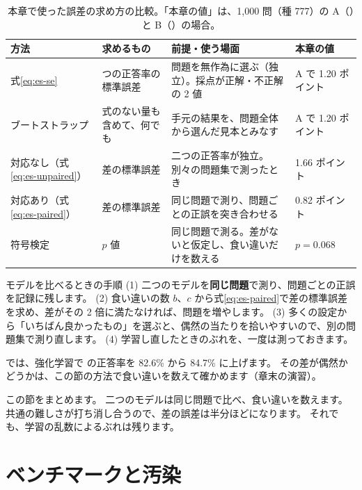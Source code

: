 \begin{table}[tbp]
\centering
\caption{本章で使った誤差の求め方の比較。「本章の値」は、1,000 問（種 777）の A（）と B（）の場合。}
\label{tab:es-error-methods}
\small
\begin{tabularx}{\linewidth}{@{}l>{\raggedright\arraybackslash}p{27mm}>{\raggedright\arraybackslash}Xl@{}}
\toprule
方法 & 求めるもの & 前提・使う場面 & 本章の値 \\
\midrule
式\eqref{eq:es-se} & 1 つの正答率の標準誤差 & 問題を無作為に選ぶ（独立）。採点が正解・不正解の 2 値 & A で 1.20 ポイント \\
ブートストラップ & 式のない量も含めて、何でも & 手元の結果を、問題全体から選んだ見本とみなす & A で 1.20 ポイント \\
対応なし（式\eqref{eq:es-unpaired}） & 差の標準誤差 & 二つの正答率が独立。別々の問題集で測ったとき & 1.66 ポイント \\
対応あり（式\eqref{eq:es-paired}） & 差の標準誤差 & 同じ問題で測り、問題ごとの正誤を突き合わせる & 0.82 ポイント \\
符号検定 & $p$ 値 & 同じ問題で測る。差がないと仮定し、食い違いだけを数える & $p=0.068$ \\
\bottomrule
\end{tabularx}
\end{table}

\begin{practice}{モデルを比べるときの手順}
(1) 二つのモデルを\textbf{同じ問題}で測り、問題ごとの正誤を記録に残します。
(2) 食い違いの数 $b$、$c$ から式\eqref{eq:es-paired}で差の標準誤差を求め、差がその 2 倍に満たなければ、問題を増やします。
(3) 多くの設定から「いちばん良かったもの」を選ぶと、偶然の当たりを拾いやすいので、別の問題集で測り直します。
(4) 学習し直したときのぶれを、一度は測っておきます。
\end{practice}

では、強化学習で  の正答率を 82.6\% から 84.7\% に上げます。
その差が偶然かどうかは、この節の方法で食い違いを数えて確かめます（章末の演習）。

この節をまとめます。
二つのモデルは同じ問題で比べ、食い違いを数えます。
共通の難しさが打ち消し合うので、差の誤差は半分ほどになります。
それでも、学習の乱数によるぶれは残ります。

\section{ベンチマークと汚染}\label{sec:es-bench}

